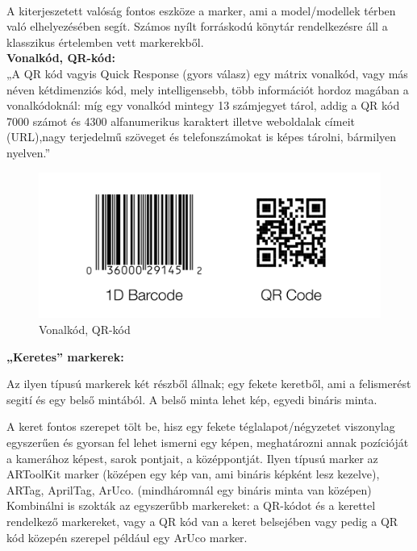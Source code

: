 

\\
A kiterjeszetett valóság fontos eszköze a marker, ami a model/modellek térben való elhelyezésében segít. Számos nyílt forráskodú könytár rendelkezésre áll a klasszikus értelemben vett markerekből.\\

{\bf Vonalkód, QR-kód:}\\
„A  QR  kód vagyis Quick  Response  (gyors  válasz) egy  mátrix  vonalkód,  vagy  más  néven kétdimenziós kód, mely intelligensebb, több információt hordoz magában a vonalkódoknál: míg egy vonalkód mintegy 13 számjegyet tárol, addig a QR kód 7000 számot és 4300 alfanumerikus karaktert illetve weboldalak címeit (URL),nagy terjedelmű szöveget és telefonszámokat is képes tárolni, bármilyen nyelven.”\\

\begin{figure}[htp]
    \centering
   	\includegraphics[width=4.8truecm, height=2truecm]{images/qr_bar.png}
	\caption{Vonalkód, QR-kód}
\end{figure}

{\bf „Keretes” markerek:}

Az ilyen típusú markerek két részből állnak; egy fekete keretből, ami a felismerést segití és egy belső mintából. A belső minta lehet kép, egyedi bináris minta.

A keret fontos szerepet tölt be, hisz egy fekete téglalapot/négyzetet viszonylag egyszerűen és gyorsan fel lehet ismerni egy képen, meghatározni annak pozícióját a kamerához képest, sarok pontjait, a középpontját.
Ilyen típusú marker az ARToolKit marker (középen egy kép van, ami bináris képként lesz kezelve), ARTag, AprilTag, ArUco. (mindháromnál egy bináris minta van középen)
Kombinálni is szokták az egyszerűbb markereket: a QR-kódot és a kerettel rendelkező markereket, vagy a QR kód van a keret belsejében vagy pedig a QR kód közepén szerepel például egy ArUco marker.

